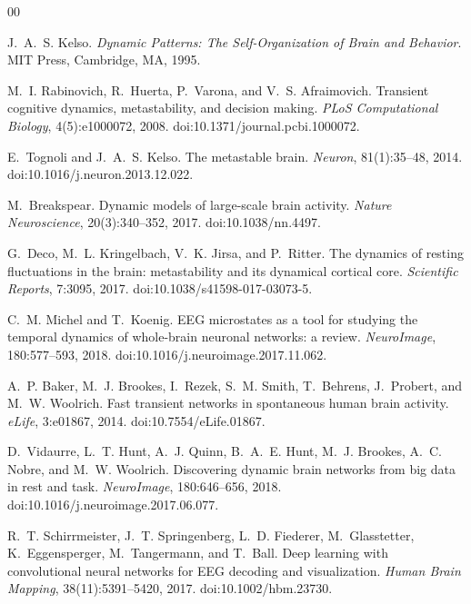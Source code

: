 \documentclass[5p,twocolumn,authoryear]{elsarticle}
\begin{document}
\begin{thebibliography}{00}

J.~A.~S. Kelso.
\newblock \emph{Dynamic Patterns: The Self-Organization of Brain and Behavior}.
\newblock MIT Press, Cambridge, MA, 1995.

M.~I. Rabinovich, R.~Huerta, P.~Varona, and V.~S. Afraimovich.
\newblock Transient cognitive dynamics, metastability, and decision making.
\newblock \emph{PLoS Computational Biology}, 4(5):e1000072, 2008.
\newblock doi:10.1371/journal.pcbi.1000072.

E.~Tognoli and J.~A.~S. Kelso.
\newblock The metastable brain.
\newblock \emph{Neuron}, 81(1):35--48, 2014.
\newblock doi:10.1016/j.neuron.2013.12.022.

M.~Breakspear.
\newblock Dynamic models of large-scale brain activity.
\newblock \emph{Nature Neuroscience}, 20(3):340--352, 2017.
\newblock doi:10.1038/nn.4497.

G.~Deco, M.~L. Kringelbach, V.~K. Jirsa, and P.~Ritter.
\newblock The dynamics of resting fluctuations in the brain: metastability and its dynamical cortical core.
\newblock \emph{Scientific Reports}, 7:3095, 2017.
\newblock doi:10.1038/s41598-017-03073-5.

C.~M. Michel and T.~Koenig.
\newblock EEG microstates as a tool for studying the temporal dynamics of whole-brain neuronal networks: a review.
\newblock \emph{NeuroImage}, 180:577--593, 2018.
\newblock doi:10.1016/j.neuroimage.2017.11.062.

A.~P. Baker, M.~J. Brookes, I.~Rezek, S.~M. Smith, T.~Behrens, J.~Probert, and M.~W. Woolrich.
\newblock Fast transient networks in spontaneous human brain activity.
\newblock \emph{eLife}, 3:e01867, 2014.
\newblock doi:10.7554/eLife.01867.

D.~Vidaurre, L.~T. Hunt, A.~J. Quinn, B.~A.~E. Hunt, M.~J. Brookes, A.~C. Nobre, and M.~W. Woolrich.
\newblock Discovering dynamic brain networks from big data in rest and task.
\newblock \emph{NeuroImage}, 180:646--656, 2018.
\newblock doi:10.1016/j.neuroimage.2017.06.077.

R.~T. Schirrmeister, J.~T. Springenberg, L.~D. Fiederer, M.~Glasstetter, K.~Eggensperger, M.~Tangermann, and T.~Ball.
\newblock Deep learning with convolutional neural networks for EEG decoding and visualization.
\newblock \emph{Human Brain Mapping}, 38(11):5391--5420, 2017.
\newblock doi:10.1002/hbm.23730.


\end{thebibliography}
\end{document}
